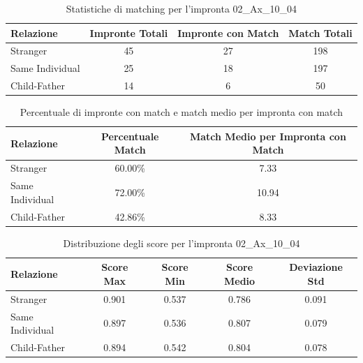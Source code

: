 \begin{table}[htbp]
\centering
\caption{Statistiche di matching per l'impronta 02\_Ax\_10\_04}
\label{tab:results_02_Ax_10_04}
\begin{tabular}{|l|c|c|c|}
\hline
\textbf{Relazione} & \textbf{Impronte Totali} & \textbf{Impronte con Match} & \textbf{Match Totali} \\
\hline
Stranger & 45 & 27 & 198 \\
\hline
Same Individual & 25 & 18 & 197 \\
\hline
Child-Father & 14 & 6 & 50 \\
\hline
\end{tabular}
\end{table}


\begin{table}[htbp]
\centering
\caption{Percentuale di impronte con match e match medio per impronta con match}
\label{tab:match_percentage_02_Ax_10_04}
\begin{tabular}{|l|c|c|}
\hline
\textbf{Relazione} & \textbf{Percentuale Match} & \textbf{Match Medio per Impronta con Match} \\
\hline
Stranger & 60.00\% & 7.33 \\
\hline
Same Individual & 72.00\% & 10.94 \\
\hline
Child-Father & 42.86\% & 8.33 \\
\hline
\end{tabular}
\end{table}


\begin{table}[htbp]
\centering
\caption{Distribuzione degli score per l'impronta 02\_Ax\_10\_04}
\label{tab:scores_02_Ax_10_04}
\begin{tabular}{|l|c|c|c|c|}
\hline
\textbf{Relazione} & \textbf{Score Max} & \textbf{Score Min} & \textbf{Score Medio} & \textbf{Deviazione Std} \\
\hline
Stranger & 0.901 & 0.537 & 0.786 & 0.091 \\
\hline
Same Individual & 0.897 & 0.536 & 0.807 & 0.079 \\
\hline
Child-Father & 0.894 & 0.542 & 0.804 & 0.078 \\
\hline
\end{tabular}
\end{table}


